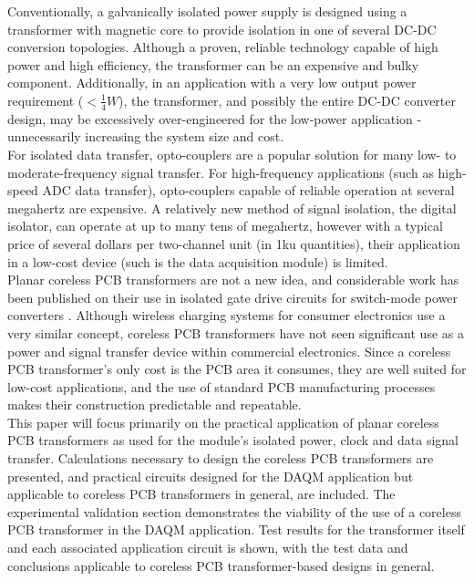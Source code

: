 \documentclass[conference]{IEEEtran}
\begin{document}
Conventionally, a galvanically isolated power supply is designed using a transformer with magnetic core to provide isolation in one of several DC-DC conversion topologies.  Although a proven, reliable technology capable of high power and high efficiency, the transformer can be an expensive and bulky component.  Additionally, in an application with a very low output power requirement ($<\frac{1}{4}W$), the transformer, and possibly the entire DC-DC converter design, may be excessively over-engineered for the low-power application - unnecessarily increasing the system size and cost.
\\
For isolated data transfer, opto-couplers are a popular solution for many low- to moderate-frequency signal transfer.  For high-frequency applications (such as high-speed ADC data transfer), opto-couplers capable of reliable operation at several megahertz are expensive.  A relatively new method of signal isolation, the digital isolator, can operate at up to many tens of megahertz, however with a typical price of several dollars per two-channel unit (in 1ku quantities), their application in a low-cost device (such is the data acquisition module) is limited.
\\
Planar coreless PCB transformers are not a new idea, and considerable work has been published on their use in isolated gate drive circuits for switch-mode power converters \cite{TangHuiFundamental}\cite{NaturallySoft}\cite{OptimalOperation}\cite{CorelessGateDrive}.  Although wireless charging systems for consumer electronics use a very similar concept, coreless PCB transformers have not seen significant use as a power and signal transfer device within commercial electronics.  Since a coreless PCB transformer's only cost is the PCB area it consumes, they are well suited for low-cost applications, and the use of standard PCB manufacturing processes makes their construction predictable and repeatable.
\\
This paper will focus primarily on the practical application of planar coreless PCB transformers as used for the module's isolated power, clock and data signal transfer.  Calculations necessary to design the coreless PCB transformers are presented, and practical circuits designed for the DAQM application but applicable to coreless PCB transformers in general, are included.  The experimental validation section demonstrates the viability of the use of a coreless PCB transformer in the DAQM application.  Test results for the transformer itself and each associated application circuit is shown, with the test data and conclusions applicable to coreless PCB transformer-based designs in general.
\end{document}
